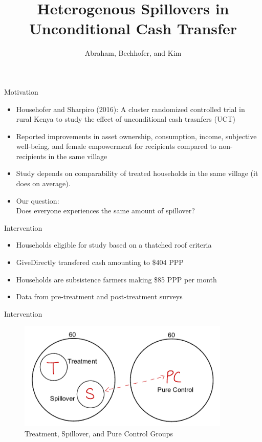 \documentclass[14pt, aspectratio=169]{beamer}
\title[Heteregenous Spillovers in Unconditional Cash Transfer] %
{Heterogenous Spillovers in Unconditional Cash Transfer}
\author[Abraham, Bechhofer, and Kim] %
{Abraham, Bechhofer, and Kim }
\begin{document}
\begin{frame}
  \titlepage
\end{frame}

\begin{frame}{Motivation}
\begin{itemize}
	\item Househofer and Sharpiro (2016): A cluster randomized controlled trial in rural Kenya to study the effect of unconditional cash trasnfers (UCT)
    \item Reported improvements in asset ownership, consumption, income, subjective well-being, and female empowerment for recipients compared to non-recipients in the same village
    \item Study depends on comparability of treated households in the same village (it does on average).
	\item Our question: \\ Does everyone experiences the same amount of spillover?
\end{itemize}
\end{frame}

\begin{frame}{Intervention}
    \begin{itemize}
    	\item Households eligible for study based on a thatched roof criteria
        \item GiveDirectly transfered cash amounting to \$404 PPP
        \item Households are subsistence farmers making \$85 PPP per month
        \item Data from pre-treatment and post-treatment surveys
    \end{itemize}
\end{frame}

\begin{frame}{Intervention}
\begin{figure}[H]
	\centering
	\includegraphics[width=0.9\textwidth]{design.png}
	\caption{Treatment, Spillover, and Pure Control Groups}
\end{figure}
\end{frame}
\end{document}
